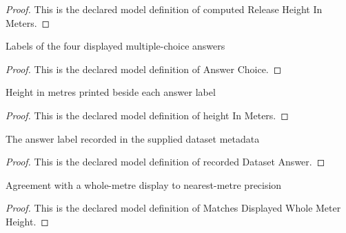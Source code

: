 \begin{proof}
  This is the declared model definition of computed Release Height In Meters.
\end{proof}
\begin{definition}
  \label{def:physics:phyx-mini-0738:phyxminiproblems-problemphyxmini0738-answerchoice}
  Labels of the four displayed multiple-choice answers
\end{definition}
\begin{proof}
  This is the declared model definition of Answer Choice.
\end{proof}
\begin{definition}
  \label{def:physics:phyx-mini-0738:phyxminiproblems-problemphyxmini0738-answerchoice-heightinmeters}
  Height in metres printed beside each answer label
\end{definition}
\begin{proof}
  This is the declared model definition of height In Meters.
\end{proof}
\begin{definition}
  \label{def:physics:phyx-mini-0738:phyxminiproblems-problemphyxmini0738-recordeddatasetanswer}
  The answer label recorded in the supplied dataset metadata
\end{definition}
\begin{proof}
  This is the declared model definition of recorded Dataset Answer.
\end{proof}
\begin{definition}
  \label{def:physics:phyx-mini-0738:phyxminiproblems-problemphyxmini0738-matchesdisplayedwholemeterheight}
  Agreement with a whole-metre display to nearest-metre precision
\end{definition}
\begin{proof}
  This is the declared model definition of Matches Displayed Whole Meter Height.
\end{proof}
